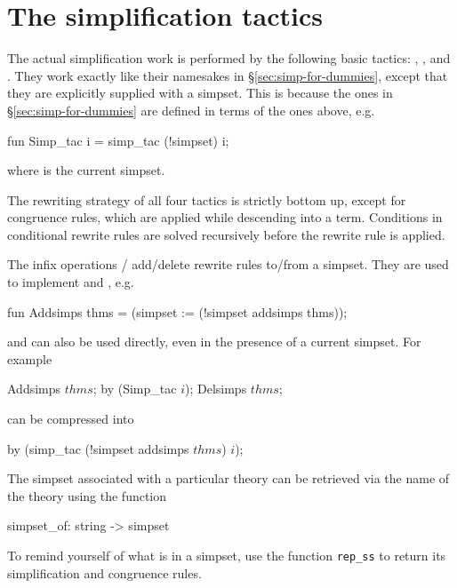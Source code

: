 \section{The simplification tactics}
\label{simp-tactics}

The actual simplification work is performed by the following basic tactics:
, ,
 and . They work
exactly like their namesakes in \S\ref{sec:simp-for-dummies}, except that
they are explicitly supplied with a simpset. This is because the ones in
\S\ref{sec:simp-for-dummies} are defined in terms of the ones above, e.g.
\begin{ttbox}
fun Simp_tac i = simp_tac (!simpset) i;
\end{ttbox}
where  is the current simpset.

The rewriting strategy of all four tactics is strictly bottom up, except for
congruence rules, which are applied while descending into a term.  Conditions
in conditional rewrite rules are solved recursively before the rewrite rule
is applied.

The infix operations / add/delete rewrite
rules to/from a simpset. They are used to implement  and
, e.g.
\begin{ttbox}
fun Addsimps thms = (simpset := (!simpset addsimps thms));
\end{ttbox}
and can also be used directly, even in the presence of a current simpset. For
example
\begin{ttbox}
Addsimps \(thms\);
by (Simp_tac \(i\));
Delsimps \(thms\);
\end{ttbox}
can be compressed into
\begin{ttbox}
by (simp_tac (!simpset addsimps \(thms\)) \(i\));
\end{ttbox}

The simpset associated with a particular theory can be retrieved via the name
of the theory using the function
\begin{ttbox}
simpset_of: string -> simpset
\end{ttbox}

To remind yourself of what is in a simpset, use the function \verb$rep_ss$ to
return its simplification and congruence rules.

